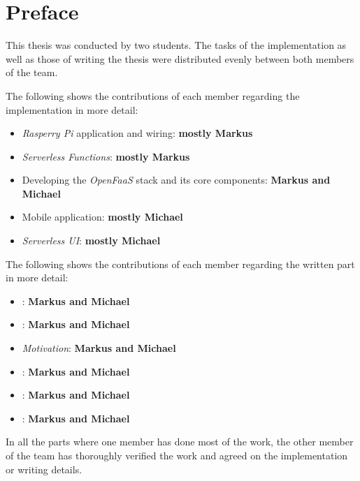 \section*{Preface}

This thesis was conducted by two students. The tasks of the implementation as well as those of
writing the thesis were distributed evenly between both members of the team.

The following shows the contributions of each member regarding the implementation in more detail:

\begin{itemize}
  \setlength\itemsep{-1em}
  \item \textit{Rasperry Pi} application and wiring: \textbf{mostly Markus}
  \item \textit{Serverless Functions}: \textbf{mostly Markus}
  \item Developing the \textit{OpenFaaS} stack and its core components: \textbf{Markus and Michael}
  \item Mobile application: \textbf{mostly Michael}
  \item \textit{Serverless UI}: \textbf{mostly Michael}
\end{itemize}

The following shows the contributions of each member regarding the written part in more detail:

\begin{itemize}
  \setlength\itemsep{-1em}
  \item {} : \textbf{Markus and Michael}
  \item {} : \textbf{Markus and Michael}
  \item {}  \textit{Motivation}: \textbf{Markus and Michael}
  \item {} : \textbf{Markus and Michael}
  \item {} : \textbf{Markus and Michael}
  \item {} : \textbf{Markus and Michael}
\end{itemize}

In all the parts where one member has done most of the work, the other member of the team has
thoroughly verified the work and agreed on the implementation or writing details.
